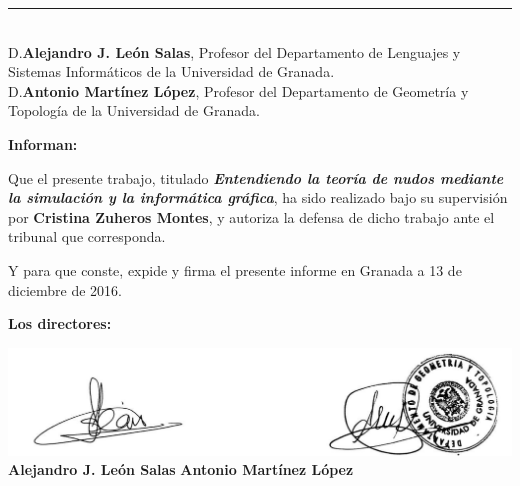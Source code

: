 \documentclass[14pt]{extarticle}
\begin{document}
\thispagestyle{empty}

\noindent\rule[-1ex]{\textwidth}{2pt}\\[4.5ex]

D.\textbf{Alejandro J. León Salas}, Profesor del Departamento de Lenguajes y Sistemas Informáticos de la Universidad de Granada.\\

D.\textbf{Antonio Martínez López}, Profesor del Departamento de Geometría y Topología de la Universidad de Granada.\\

\vspace{0.5cm}

\textbf{Informan:}

\vspace{0.5cm}

Que el presente trabajo, titulado \textit{\textbf{Entendiendo la teoría de nudos mediante la simulación y la informática gráfica}},
ha sido realizado bajo su supervisión por \textbf{Cristina Zuheros Montes}, y autoriza la defensa de dicho trabajo ante el tribunal
que corresponda.

\vspace{0.5cm}

Y para que conste, expide y firma el presente informe en Granada a 13 de diciembre de 2016.

\vspace{1cm}

\textbf{Los directores:}

\vspace{1cm}

\includegraphics[width=1\textwidth]{firmaTutores.jpg}\\
\noindent \textbf{Alejandro J. León Salas} \hspace{6cm} \textbf{Antonio Martínez López}
\end{document}
